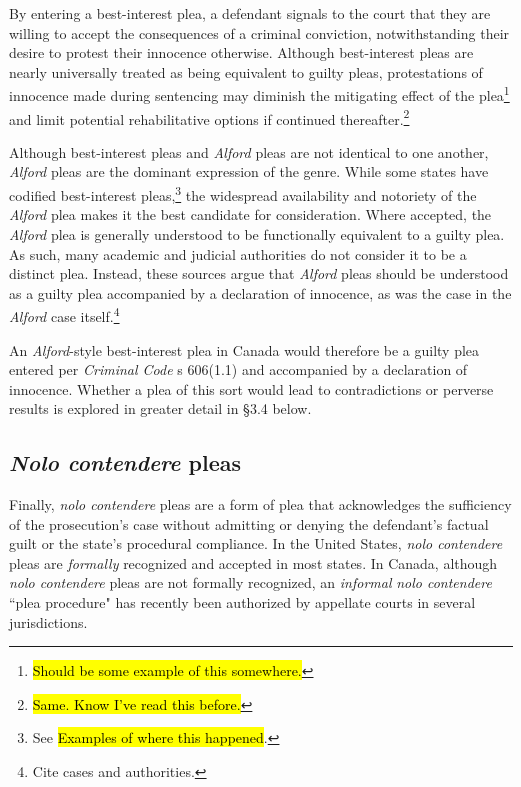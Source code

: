 By entering a best-interest plea, a defendant signals to the court that they are willing to accept the consequences of a criminal conviction, notwithstanding their desire to protest their innocence otherwise. Although best-interest pleas are nearly universally treated as being equivalent to guilty pleas, protestations of innocence made during sentencing may diminish the mitigating effect of the plea\footnote{\hl{Should be some example of this somewhere.}} and limit potential rehabilitative options if continued thereafter.\footnote{\hl{Same. Know I've read this before.}}

Although best-interest pleas and \textit{Alford} pleas are not identical to one another, \textit{Alford} pleas are the dominant expression of the genre. While some states have codified best-interest pleas,\footnote{See \hl{Examples of where this happened}.} the widespread availability and notoriety of the \textit{Alford} plea makes it the best candidate for consideration. Where accepted, the \textit{Alford} plea is generally understood to be functionally equivalent to a guilty plea. As such, many academic and judicial authorities do not consider it to be a distinct plea. Instead, these sources argue that \textit{Alford} pleas should be understood as a guilty plea accompanied by a declaration of innocence, as was the case in the \textit{Alford} case itself.\footnote{Cite cases and authorities.}

An \textit{Alford}-style best-interest plea in Canada would therefore be a guilty plea entered per \textit{Criminal Code} s 606(1.1) and accompanied by a declaration of innocence. Whether a plea of this sort would lead to contradictions or perverse results is explored in greater detail in §3.4 below.

\subsection{\textit{Nolo contendere} pleas}

Finally, \textit{nolo contendere} pleas are a form of plea that acknowledges the sufficiency of the prosecution's case without admitting or denying the defendant's factual guilt or the state's procedural compliance. In the United States, \textit{nolo contendere} pleas are \textit{formally} recognized and accepted in most states. In Canada, although \textit{nolo contendere} pleas are not formally recognized, an \textit{informal} \textit{nolo contendere} ``plea procedure" has recently been authorized by appellate courts in several jurisdictions. 

